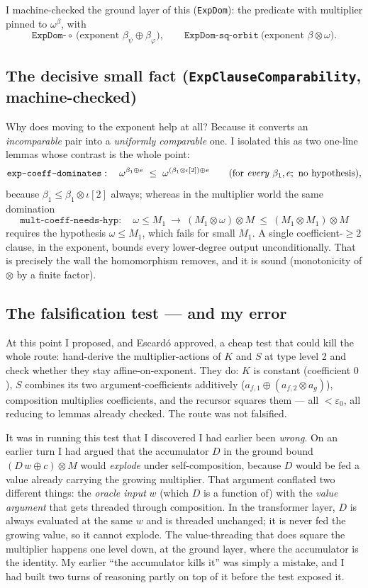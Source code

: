 \documentclass[11pt]{article}
\newcommand{\eps}{\varepsilon_0}
\newcommand{\code}[1]{\texttt{#1}}
\theoremstyle{definition}
\begin{document}
I machine-checked the ground layer of this (\code{ExpDom}): the predicate with
multiplier pinned to $\omega^\beta$, with
\[
 \code{ExpDom-}\!\circ \ \text{(exponent } \beta_\psi\oplus\beta_\varphi\text{)},
 \qquad
 \code{ExpDom-sq-orbit}\ \text{(exponent } \beta\otimes\omega\text{)}.
\]

\subsection{The decisive small fact (\code{ExpClauseComparability}, machine-checked)}

Why does moving to the exponent help at all? Because it converts an
\emph{incomparable} pair into a \emph{uniformly comparable} one. I isolated this
as two one-line lemmas whose contrast is the whole point:
\[
  \code{exp-coeff-dominates}:\quad
  \omega^{\beta_1\oplus e}\ \le\ \omega^{(\beta_1\otimes\iota[2])\oplus e}
  \qquad(\text{for \emph{every} }\beta_1,e;\ \text{no hypothesis}),
\]
because $\beta_1\le\beta_1\otimes\iota[2]$ always; whereas in the multiplier
world the same domination
\[
  \code{mult-coeff-needs-hyp}:\quad
  \omega\le M_1 \ \longrightarrow\ (M_1\otimes\omega)\otimes M \ \le\ (M_1\otimes M_1)\otimes M
\]
requires the hypothesis $\omega\le M_1$, which fails for small $M_1$. A single
coefficient-$\ge 2$ clause, in the exponent, bounds every lower-degree output
unconditionally. That is precisely the wall the homomorphism removes, and it is
sound (monotonicity of $\otimes$ by a finite factor).

\subsection{The falsification test --- and my error}

At this point I proposed, and Escardó approved, a cheap test that could kill the
whole route: hand-derive the multiplier-actions of $K$ and $S$ at type level 2
and check whether they stay affine-on-exponent. They do: $K$ is constant
(coefficient $0$), $S$ combines its two argument-coefficients additively
($a_{f,1}\oplus(a_{f,2}\otimes a_g)$), composition multiplies coefficients, and
the recursor squares them --- all $<\eps$, all reducing to lemmas already
checked. The route was not falsified.

It was in running this test that I discovered I had earlier been \emph{wrong}.
On an earlier turn I had argued that the accumulator $D$ in the ground bound
$(D\,w\oplus c)\otimes M$ would \emph{explode} under self-composition, because
$D$ would be fed a value already carrying the growing multiplier. That argument
conflated two different things: the \emph{oracle input} $w$ (which $D$ is a
function of) with the \emph{value argument} that gets threaded through
composition. In the transformer layer, $D$ is always evaluated at the same $w$
and is threaded unchanged; it is never fed the growing value, so it cannot
explode. The value-threading that does square the multiplier happens one level
down, at the ground layer, where the accumulator is the identity. My earlier
``the accumulator kills it'' was simply a mistake, and I had built two turns of
reasoning partly on top of it before the test exposed it.
\end{document}
